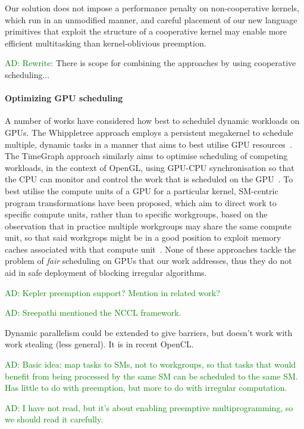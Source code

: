 \documentclass[numbers,nocopyrightspace,10pt]{sigplanconf}
\newcommand{\ADComment}[1]{\textcolor{green}{AD: #1}}
\begin{document}
Our solution does not impose a performance penalty on non-cooperative
kernels, which run in an unmodified manner, and careful placement of
our new language primitives that exploit the structure of a
cooperative kernel may enable more efficient multitasking than
kernel-oblivious preemption.

\ADComment{Rewrite:} There is scope for combining the approaches by using cooperative scheduling...

\paragraph{Optimizing GPU scheduling}
%
A number of works have considered how best to schedulel dynamic
workloads on GPUs.  The Whippletree approach employs a persistent
megakernel to schedule multiple, dynamic tasks in a manner that aims
to best utilise GPU
resources~\cite{DBLP:journals/tog/SteinbergerKBKDS14}.  The TimeGraph
approach similarly aims to optimise scheduling of competing workloads,
in the context of OpenGL, using GPU-CPU synchronisation so that the
CPU can monitor and control the work that is scheduled on the
GPU~\cite{DBLP:conf/usenix/KatoLRI11}.  To best utilise the compute
units of a GPU for a particular kernel, SM-centric program
transformations have been proposed, which aim to direct work to
specific compute units, rather than to specific workgroups, based on
the observation that in practice multiple workgroups may share the
same compute unit, so that said workgrops might be in a good position
to exploit memory caches associated with that compute
unit~\cite{DBLP:conf/ics/WuCLSV15}.  None of these approaches tackle
the problem of \emph{fair} scheduling on GPUs that our work addresses, thus they do not aid in safe deployment of blocking irregular algorithms.

%
\ADComment{Kepler preemption support?  Mention in related work?}

\ADComment{Sreepathi mentioned the NCCL framework.}


Dynamic parallelism could be extended to give barriers, but doesn't work with work stealing (less general).  It is in recent OpenCL.

\cite{} \ADComment{Basic idea: map tasks to
  SMs, not to workgroups, so that tasks that would benefit from being
  processed by the same SM can be scheduled to the same SM.  Has
  little to do with preemption, but more to do with irregular
  computation.}

\cite{DBLP:conf/isca/TanasicGCRNV14} \ADComment{I have not read, but
  it's about enabling preemptive multiprogramming, so we should read
  it carefully.}
\end{document}

